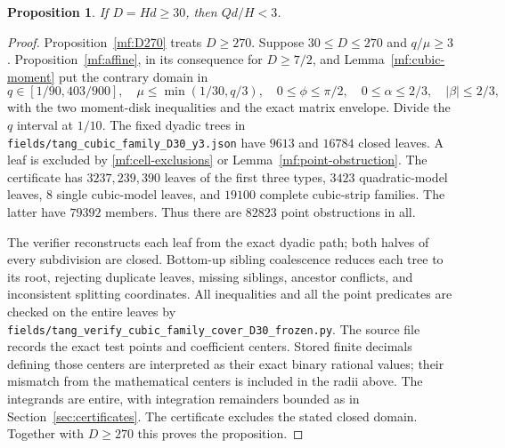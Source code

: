 \documentclass[11pt,reqno]{amsart}
\numberwithin{equation}{section}
\newtheorem{proposition}[theorem]{Proposition}
\theoremstyle{definition}
\theoremstyle{remark}
\DeclareRobustCommand{\cert}[1]{\nolinkurl{#1}}
\begin{document}
\begin{proposition}\label{mf:D30}
If $D=Hd\ge30$, then $Qd/H<3$.
\end{proposition}
\begin{proof}
Proposition~\ref{mf:D270} treats $D\ge270$. Suppose
$30\le D\le270$ and $q/\mu\ge3$.
Proposition~\ref{mf:affine}, in its consequence for $D\ge7/2$,
and Lemma~\ref{mf:cubic-moment} put the contrary domain in
\[
 q\in[1/90,403/900],\quad
 \mu\le\min(1/30,q/3),\quad
 0\le\phi\le\pi/2,\quad
 0\le\alpha\le2/3,\quad|\beta|\le2/3,
\]
with the two moment-disk inequalities and the exact matrix
envelope. Divide the $q$ interval at $1/10$.
The fixed dyadic trees in
\cert{fields/tang_cubic_family_D30_y3.json}
have $9613$ and $16784$ closed leaves. A leaf is excluded by
\eqref{mf:cell-exclusions} or Lemma~\ref{mf:point-obstruction}.
The certificate has $3237,239,390$ leaves of the first three
types, $3423$ quadratic-model leaves, $8$ single cubic-model
leaves, and $19100$ complete cubic-strip families.
The latter have $79392$ members. Thus there are $82823$
point obstructions in all.

The verifier reconstructs each leaf from the exact dyadic
path; both halves of every subdivision are closed. Bottom-up
sibling coalescence reduces each tree to its root,
rejecting duplicate leaves, missing siblings, ancestor conflicts,
and inconsistent splitting coordinates. All inequalities and
all the point predicates are checked on the entire leaves by
\cert{fields/tang_verify_cubic_family_cover_D30_frozen.py}.
The source file records the exact test points and coefficient
centers. Stored finite decimals defining those centers are
interpreted as their exact binary rational values; their
mismatch from the mathematical centers is included in the
radii above. The integrands are entire, with integration remainders
bounded as in Section~\ref{sec:certificates}.
The certificate excludes the stated closed domain.
Together with $D\ge270$ this proves the proposition.
\end{proof}
\end{document}

